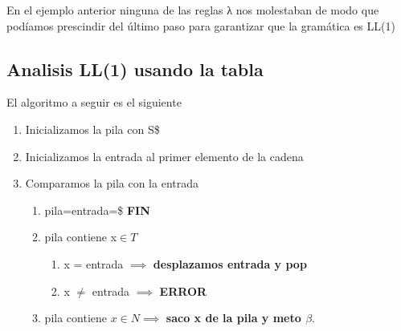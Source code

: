 \documentclass{apuntes}
\begin{document}
En el ejemplo anterior ninguna de las reglas λ nos molestaban de modo que podíamos prescindir del último paso para garantizar que la gramática es LL(1)

\subsection{Analisis LL(1) usando la tabla}
El algoritmo a seguir es el siguiente
\begin{enumerate}
\item Inicializamos la pila con S\$
\item Inicializamos la entrada al primer elemento de la cadena
\item Comparamos la pila con la entrada
\begin{enumerate}
\item pila=entrada=\$ \textbf{FIN}
\item pila contiene x$\in T$
\begin{enumerate}
\item x = entrada $\implies$ \textbf{desplazamos entrada y pop}
\item x $\neq$ entrada $\implies$ \textbf{ERROR}
\end{enumerate}
\item pila contiene $x \in N \implies$ \textbf{saco x de la pila y meto $\beta$}.
\end{enumerate}
\end{enumerate}
\end{document}
